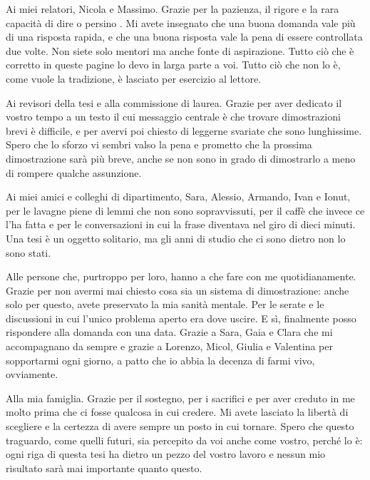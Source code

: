 Ai miei relatori, Nicola e Massimo. Grazie per la pazienza, il rigore e la rara capacità di dire  o persino . Mi avete insegnato che una buona domanda vale più di una risposta rapida, e che una buona risposta vale la pena di essere controllata due volte. Non siete solo mentori ma anche fonte di aspirazione. Tutto ciò che è corretto in queste pagine lo devo in larga parte a voi. Tutto ciò che non lo è, come vuole la tradizione, è lasciato per esercizio al lettore.

Ai revisori della tesi e alla commissione di laurea. Grazie per aver dedicato il vostro tempo a un testo il cui messaggio centrale è che trovare dimostrazioni brevi è difficile, e per avervi poi chiesto di leggerne svariate che sono lunghissime. Spero che lo sforzo vi sembri valso la pena e prometto che la prossima dimostrazione sarà più breve, anche se non sono in grado di dimostrarlo a meno di rompere qualche assunzione.

Ai miei amici e colleghi di dipartimento, Sara, Alessio, Armando, Ivan e Ionut, per le lavagne piene di lemmi che non sono sopravvissuti, per il caffè che invece ce l'ha fatta e per le conversazioni in cui la frase  diventava  nel giro di dieci minuti. Una tesi è un oggetto solitario, ma gli anni di studio che ci sono dietro non lo sono stati.

Alle persone che, purtroppo per loro, hanno a che fare con me quotidianamente. Grazie per non avermi mai chiesto cosa sia un sistema di dimostrazione: anche solo per questo, avete preservato la mia sanità mentale. Per le serate e le discussioni in cui l'unico problema aperto era dove uscire. E sì, finalmente posso rispondere alla domanda  con una data. Grazie a Sara, Gaia e Clara che mi accompagnano da sempre e grazie a Lorenzo, Micol, Giulia e Valentina per sopportarmi ogni giorno, a patto che io abbia la decenza di farmi vivo, ovviamente.

Alla mia famiglia. Grazie per il sostegno, per i sacrifici e per aver creduto in me molto prima che ci fosse qualcosa in cui credere. Mi avete lasciato la libertà di scegliere e la certezza di avere sempre un posto in cui tornare. Spero che questo traguardo, come quelli futuri, sia percepito da voi anche come vostro, perché lo è: ogni riga di questa tesi ha dietro un pezzo del vostro lavoro e nessun mio risultato sarà mai importante quanto questo.

